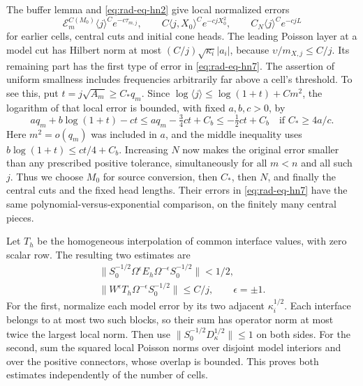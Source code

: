 The buffer lemma and \eqref{eq:rad-eq-hn2} give local normalized errors
\begin{equation}\label{eq:rad-eq-hn7}
 \mathcal E_m^{C(M_0)}\langle j\rangle^C e^{-c\tau_{m,j}},\qquad
 C\langle j,X_0\rangle^Ce^{-cjX_0^2},\qquad
 C_N\langle j\rangle^Ce^{-cjL}
\end{equation}
for earlier cells, central cuts and initial cone heads.  The leading
Poisson layer at a model cut has Hilbert norm at most
$(C/j)\sqrt{\kappa_i}|a_i|$, because
$\upsilon/m_{X,j}\le C/j$.  Its remaining part has the first type
of error in \eqref{eq:rad-eq-hn7}.  The assertion of uniform smallness
includes frequencies arbitrarily far above a cell's threshold.  To see
this, put $t=j\sqrt{A_m}\ge C_*q_m$.  Since
$\log\langle j\rangle\le\log(1+t)+Cm^2$, the logarithm of that
local error is bounded, with fixed $a,b,c>0$, by
\begin{equation}\label{eq:inner-uniform-suppression}
 a q_m+b\log(1+t)-ct
 \le a q_m-\tfrac34ct+C_b
 \le-\tfrac12ct+C_b
 \quad\text{if }C_*\ge4a/c.
\end{equation}
Here $m^2=o(q_m)$ was included in $a$, and the middle inequality uses
$b\log(1+t)\le ct/4+C_b$.  Increasing $N$ now makes the original error
smaller than any prescribed positive tolerance, simultaneously for all $m<n$
and all such $j$.  Thus we choose $M_0$ for source conversion, then
$C_*$, then $N$, and finally the central cuts and the fixed head
lengths.  Their errors in \eqref{eq:rad-eq-hn7} have the same
polynomial-versus-exponential comparison, on the finitely many central
pieces.

Let $T_h$ be the homogeneous interpolation of common interface values,
with zero scalar row.  The resulting two estimates are
\begin{equation}\label{eq:rad-eq-hn8}
 \begin{gathered}
 \|S_0^{-1/2}\Omega^\epsilon E_h\Omega^{-\epsilon}S_0^{-1/2}\|<1/2,\\
 \|W^\epsilon T_h\Omega^{-\epsilon}S_0^{-1/2}\|\le C/j,
 \qquad \epsilon=\pm1.
 \end{gathered}
\end{equation}
For the first, normalize each model error by its two adjacent
$\kappa_i^{1/2}$.  Each interface belongs to at most two such blocks,
so their sum has operator norm at most twice the largest local norm.
Then use $\|S_0^{-1/2}D_\kappa^{1/2}\|\le1$ on both sides.
For the second, sum the squared local Poisson norms over disjoint model
interiors and over the positive connectors, whose overlap is bounded.
This proves both estimates independently of the number of cells.

